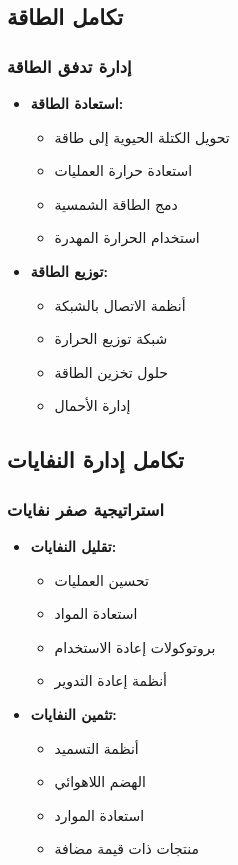 \subsection{تكامل الطاقة}

\subsubsection{إدارة تدفق الطاقة}
\begin{itemize}
    \item \textbf{استعادة الطاقة:}
    \begin{itemize}
        \item تحويل الكتلة الحيوية إلى طاقة
        \item استعادة حرارة العمليات
        \item دمج الطاقة الشمسية
        \item استخدام الحرارة المهدرة
    \end{itemize}
    
    \item \textbf{توزيع الطاقة:}
    \begin{itemize}
        \item أنظمة الاتصال بالشبكة
        \item شبكة توزيع الحرارة
        \item حلول تخزين الطاقة
        \item إدارة الأحمال
    \end{itemize}
\end{itemize}

\subsection{تكامل إدارة النفايات}

\subsubsection{استراتيجية صفر نفايات}
\begin{itemize}
    \item \textbf{تقليل النفايات:}
    \begin{itemize}
        \item تحسين العمليات
        \item استعادة المواد
        \item بروتوكولات إعادة الاستخدام
        \item أنظمة إعادة التدوير
    \end{itemize}
    
    \item \textbf{تثمين النفايات:}
    \begin{itemize}
        \item أنظمة التسميد
        \item الهضم اللاهوائي
        \item استعادة الموارد
        \item منتجات ذات قيمة مضافة
    \end{itemize}
\end{itemize}

